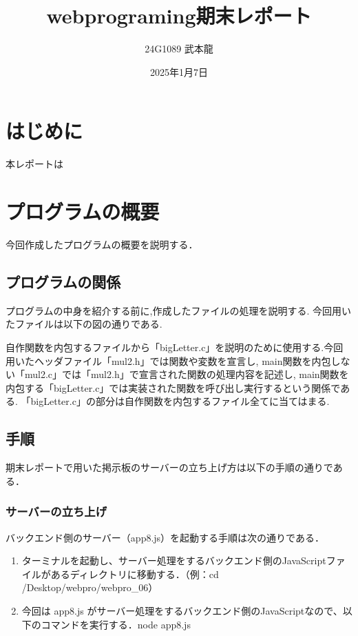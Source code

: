 \documentclass[uplatex,dvipdfmx]{jsarticle}
\begin{document}
\title{webprograming期末レポート} %
\author{24G1089 武本龍}
\date{2025年1月7日}
\maketitle

\section{はじめに}
本レポートは


\section{プログラムの概要}
今回作成したプログラムの概要を説明する．



\subsection{プログラムの関係}
プログラムの中身を紹介する前に,作成したファイルの処理を説明する.
今回用いたファイルは以下の図の通りである.


 
自作関数を内包するファイルから「bigLetter.c」を説明のために使用する.今回用いたヘッダファイル「mul2.h」では関数や変数を宣言し,
main関数を内包しない「mul2.c」では「mul2.h」で宣言された関数の処理内容を記述し,
main関数を内包する「bigLetter.c」では実装された関数を呼び出し実行するという関係である.
「bigLetter.c」の部分は自作関数を内包するファイル全てに当てはまる.

\subsection{手順}
期末レポートで用いた掲示板のサーバーの立ち上げ方は以下の手順の通りである．

\subsubsection{サーバーの立ち上げ}
バックエンド側のサーバー（app8.js）を起動する手順は次の通りである．
\begin{enumerate}
    \item ターミナルを起動し、サーバー処理をするバックエンド側のJavaScriptファイルがあるディレクトリに移動する．（例：cd /Desktop/webpro/webpro\_06）
    \item 今回は app8.js がサーバー処理をするバックエンド側のJavaScriptなので、以下のコマンドを実行する．node app8.js
\end{enumerate}
\end{document}
